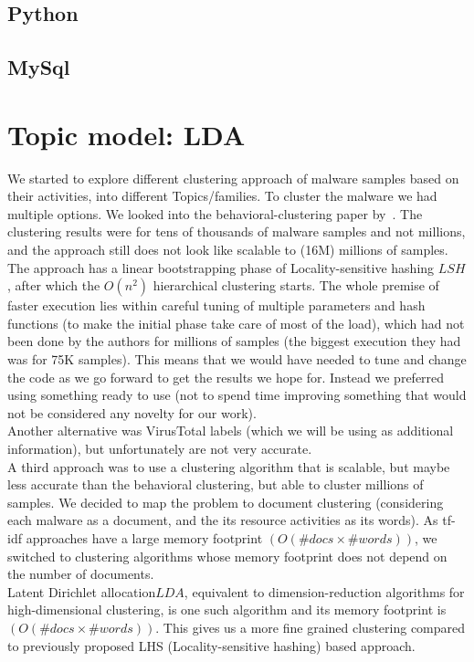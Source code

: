\subsection{Python}
\label{sub:Python}
\subsection{MySql}
\label{sub:MySql}
\section{Topic model: LDA}
\label{sec:Topic model: LDA}
We started to explore different clustering approach of malware samples based on their activities, into different Topics/families.
To cluster the malware we had multiple options. We looked into the behavioral-clustering paper by~\cite[Bayer]{bayer}.
The clustering results were for tens of thousands of malware samples and not millions, and the approach still does not look like scalable to (16M) millions of samples.
The approach has a linear bootstrapping phase of Locality-sensitive hashing \(LSH\), after which the $O(n^2)$ hierarchical clustering starts.
The whole premise of faster execution lies within careful tuning of multiple parameters and hash functions (to make the initial phase take care of most of the load), which had not been done by the authors for millions of samples (the biggest execution they had was for 75K samples).
This means that we would have needed to tune and change the code as we go forward to get the results we hope for.
Instead we preferred using something ready to use (not to spend time improving something that would not be considered any novelty for our work).
\\
Another alternative was VirusTotal labels (which we will be using as additional information), but unfortunately are not very accurate.
\\
A third approach was to use a clustering algorithm that is scalable, but maybe less accurate than the behavioral clustering, but able to cluster millions of samples.
We decided to map the problem to document clustering (considering each malware as a document, and the its resource activities as its words).
As {tf-idf} approaches have a large memory footprint $(O(\#docs \times \#words))$, we switched to clustering algorithms whose memory footprint does not depend on the number of documents.
\\
Latent Dirichlet allocation\(LDA\), equivalent to dimension-reduction algorithms for high-dimensional clustering, is one such algorithm and its memory footprint is $(O(\#docs \times \#words))$. This gives us a more fine grained clustering compared to previously proposed LHS (Locality-sensitive hashing) based approach.
